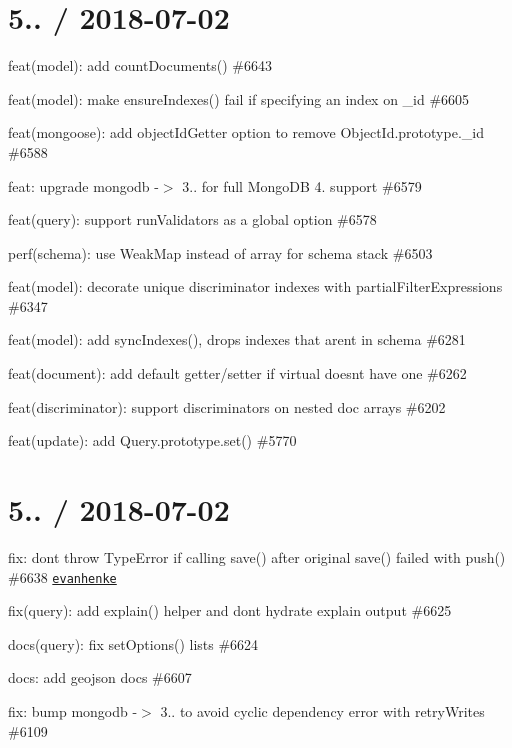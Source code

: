 \section*{5.. / 2018-\/07-\/02 }


\begin{DoxyItemize}
\item feat(model)\+: add {\ttfamily count\+Documents()} \#6643
\item feat(model)\+: make ensure\+Indexes() fail if specifying an index on \+\_\+id \#6605
\item feat(mongoose)\+: add {\ttfamily object\+Id\+Getter} option to remove Object\+Id.\+prototype.\+\_\+id \#6588
\item feat\+: upgrade mongodb -\/$>$ 3.. for full Mongo\+DB 4. support \#6579
\item feat(query)\+: support {\ttfamily run\+Validators} as a global option \#6578
\item perf(schema)\+: use Weak\+Map instead of array for schema stack \#6503
\item feat(model)\+: decorate unique discriminator indexes with partial\+Filter\+Expressions \#6347
\item feat(model)\+: add {\ttfamily sync\+Indexes()}, drops indexes that aren\textquotesingle{}t in schema \#6281
\item feat(document)\+: add default getter/setter if virtual doesn\textquotesingle{}t have one \#6262
\item feat(discriminator)\+: support discriminators on nested doc arrays \#6202
\item feat(update)\+: add {\ttfamily Query.\+prototype.\+set()} \#5770
\end{DoxyItemize}

\section*{5.. / 2018-\/07-\/02 }


\begin{DoxyItemize}
\item fix\+: don\textquotesingle{}t throw Type\+Error if calling save() after original save() failed with push() \#6638 \href{https://github.com/evanhenke}{\tt evanhenke}
\item fix(query)\+: add explain() helper and don\textquotesingle{}t hydrate explain output \#6625
\item docs(query)\+: fix {\ttfamily set\+Options()} lists \#6624
\item docs\+: add geojson docs \#6607
\item fix\+: bump mongodb -\/$>$ 3.. to avoid cyclic dependency error with retry\+Writes \#6109
\end{DoxyItemize}

